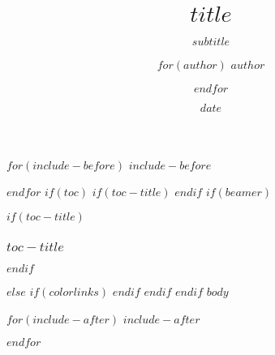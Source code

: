 \documentclass[
  $if(aspectratio)$
    aspectratio=$aspectratio$,
  $endif$
  $if(fontsize)$
    $fontsize$pt,
  $endif$
  $for(classoption)$
    $classoption$$sep$,
  $endfor$
]{beamer}
\title{$title$}
\subtitle{$subtitle$}
\author{%
    $for(author)$
    $author$
    \and
    $endfor$
  }
\date{$date$}
\begin{document}
\frame{\titlepage}

$for(include-before)$
$include-before$

$endfor$
$if(toc)$
$if(toc-title)$
\renewcommand*\contentsname{$toc-title$}
$endif$
$if(beamer)$
\begin{frame}[allowframebreaks]
$if(toc-title)$
  \frametitle{$toc-title$}
$endif$
  \tableofcontents[hideallsubsections]
\end{frame}
$else$
{
$if(colorlinks)$
\hypersetup{linkcolor=$if(toccolor)$$toccolor$$else$$endif$}
$endif$
\setcounter{tocdepth}{$toc-depth$}
\tableofcontents
}
$endif$
$endif$
$body$

$for(include-after)$
$include-after$

$endfor$
\end{document}
